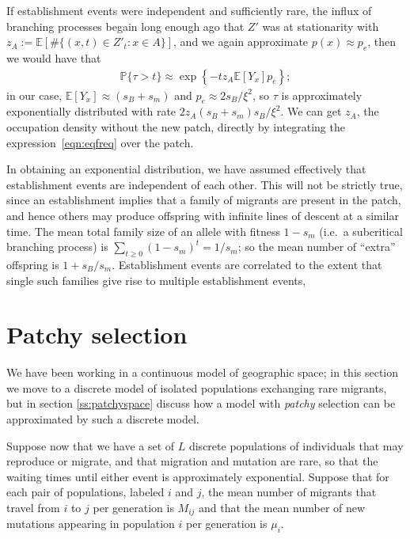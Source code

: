 \documentclass{article}
\renewcommand{\P}{\mathbb{P}}
\newcommand{\E}{\mathbb{E}}
\begin{document}
If establishment events were independent and sufficiently rare,
the influx of branching processes begain long enough ago that $Z'$ was at stationarity
with $z_A := \E[ \# \{ (x,t) \in Z'_t : x \in A \} ]$,
and we again approximate $p(x) \approx p_e$,
then we would have that 
\begin{align}
  \P\{\tau>t\} \approx \exp\left\{ - t z_A \E[Y_x] p_e \right\} ;
\end{align}
in our case, $\E[Y_x] \approx (s_B+s_m)$ and $p_e \approx 2 s_B/\xi^2$,
so $\tau$ is approximately exponentially distributed with rate $ 2 z_A (s_B+s_m) s_B/\xi^2 $.
We can get $z_A$, the occupation density without the new patch, 
directly by integrating the expression~\eqref{eqn:eqfreq} over the patch.

In obtaining an exponential distribution, we have assumed effectively that establishment events
are independent of each other.
This will not be strictly true, since an establishment implies that a family of migrants are present in the patch,
and hence others may produce offspring with infinite lines of descent at a similar time.
The mean total family size of an allele with fitness $1-s_m$ (i.e.\ a subcritical branching process) is $\sum_{t \ge 0} (1-s_m)^t = 1/s_m$;
so the mean number of ``extra'' offspring is $1+s_B/s_m$.
Establishment events are correlated to the extent that single such families give rise to multiple establishment events,





\section{Patchy selection} 
\label{ss:discretedemes}

We have been working in a continuous model of geographic space; 
in this section we move to a discrete model of isolated populations exchanging rare migrants,
but in section \ref{ss:patchyspace} discuss how a model with {\em patchy} selection can be approximated by such a discrete model.

Suppose now that we have a set of $L$ discrete populations of individuals that may reproduce or migrate,
and that migration and mutation are rare, so that the waiting times until either event is approximately exponential.
Suppose that for each pair of populations, labeled $i$ and $j$, the mean number of migrants that travel from $i$ to $j$ per generation
is $M_{ij}$ and that the mean number of new mutations appearing in population $i$ per generation is $\mu_i$.
\end{document}
